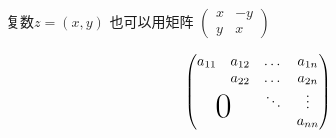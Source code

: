 \documentclass{ctexart}
\begin{document}
    复数$z=(x,y)$ 也可以用矩阵
    \begin{math}
        \left(\begin{smallmatrix}
            x & -y \\ y & x
        \end{smallmatrix}\right)
    \end{math}
    
    \[\begin{pmatrix}
        a_{11} & a_{12} & \dots & a_{1n} \\
        & a_{22} & \dots & a_{2n} \\
        & & \ddots & \vdots \\
        \multicolumn{2}{c}{\raisebox{1.3ex}[0pt]{\Huge 0}} & & a_{nn}
    \end{pmatrix}\]
\end{document}
